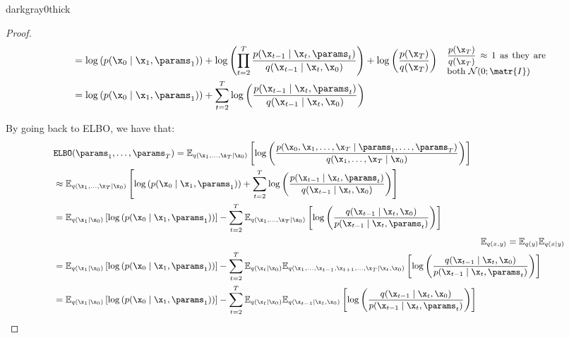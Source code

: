 \begin{description}
\begin{description}
\begin{marginbar}{darkgray}{0}{thick}
\begin{proof}
\[\begin{aligned}
                            &= \log\left( p(\x_0 \mid \x_1, \params_1) \right) + \log\left(\prod_{t=2}^{T} \frac{p(\x_{t-1} \mid \x_t, \params_t)}{q(\x_{t-1} \mid \x_{t}, \x_0)} \right) + \log\left( \frac{p(\x_T)}{q(\x_T)} \right) 
                                & \text{\parbox{0.29\linewidth}{\small $\frac{p(\x_T)}{q(\x_T)} \approx 1$ as they are both $\mathcal{N}(0; \matr{I})$}} \\
                            &= \log\left( p(\x_0 \mid \x_1, \params_1) \right) + \sum_{t=2}^{T} \log\left(\frac{p(\x_{t-1} \mid \x_t, \params_t)}{q(\x_{t-1} \mid \x_{t}, \x_0)} \right)
                        \end{aligned}
                    \]

                    By going back to ELBO, we have that:
                    \[
                        \small
                        \begin{aligned}
                            &\texttt{ELBO}(\params_1, \dots, \params_T) = \mathbb{E}_{q(\x_1, \dots, \x_T \mid \x_0)}\left[ \log\left( \frac{p(\x_0, \x_1, \dots, \x_T \mid \params_1, \dots, \params_T)}{q(\x_1, \dots, \x_T \mid \x_0)} \right) \right] \\
                            &\approx \mathbb{E}_{q(\x_1, \dots, \x_T \mid \x_0)}\left[ \log\left( p(\x_0 \mid \x_1, \params_1) \right) + \sum_{t=2}^{T} \log\left(\frac{p(\x_{t-1} \mid \x_t, \params_t)}{q(\x_{t-1} \mid \x_{t}, \x_0)} \right) \right] \\
                            &= \mathbb{E}_{q(\x_1 \mid \x_0)}\left[ \log\left( p(\x_0 \mid \x_1, \params_1) \right) \right] - \sum_{t=2}^{T} \mathbb{E}_{q(\x_1, \dots, \x_T \mid \x_0)}\left[ \log\left(\frac{q(\x_{t-1} \mid \x_{t}, \x_0)}{p(\x_{t-1} \mid \x_t, \params_t)} \right) \right] \\
                            & & \hspace{-2.5cm}\text{\small $\mathbb{E}_{q(x, y)} = \mathbb{E}_{q(y)} \mathbb{E}_{q(x \mid y)}$} \\
                            &= \mathbb{E}_{q(\x_1 \mid \x_0)}\left[ \log\left( p(\x_0 \mid \x_1, \params_1) \right) \right] - \sum_{t=2}^{T} \mathbb{E}_{q(\x_t \mid \x_0)}\mathbb{E}_{q(\x_1, \dots, \x_{t-1}, \x_{t+1}, \dots, \x_T \mid \x_t, \x_0)}\left[ \log\left(\frac{q(\x_{t-1} \mid \x_{t}, \x_0)}{p(\x_{t-1} \mid \x_t, \params_t)} \right) \right] \\
                            &= \mathbb{E}_{q(\x_1 \mid \x_0)}\left[ \log\left( p(\x_0 \mid \x_1, \params_1) \right) \right] - \sum_{t=2}^{T} \mathbb{E}_{q(\x_t \mid \x_0)}\mathbb{E}_{q(\x_{t-1} \mid \x_t, \x_0)}\left[ \log\left(\frac{q(\x_{t-1} \mid \x_{t}, \x_0)}{p(\x_{t-1} \mid \x_t, \params_t)} \right) \right] \\

\end{aligned}\]
\end{proof}
\end{marginbar}
\end{description}
\end{description}
